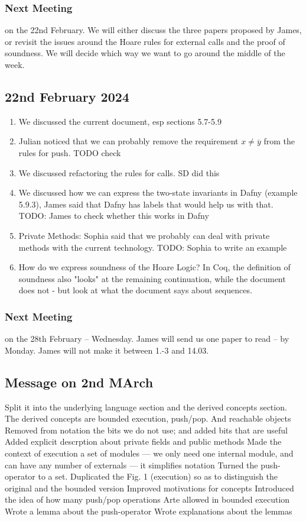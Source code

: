 \documentclass[acmsmall,review,anonymous]{acmart}\settopmatter{printfolios=true}
\begin{document}
\subsubsection*{Next Meeting}  on the 22nd February. We will either discuss the three papers proposed by James, or revisit the issues around the Hoare rules for external calls and the proof of soundness. We will decide which way we want to go around the middle of the week.


\subsection* {22nd February 2024}
\begin{enumerate}
\item
We discussed the current document, esp sections 5.7-5.9
\item
Julian noticed that we can probably remove the requirement $x\neq\overline{y}$ from the rules for push. TODO check
\item
We discussed refactoring the rules for calls. SD did this
\item
We discussed how we can express the two-state invariants in Dafny (example 5.9.3), James said that Dafny has labels that would help us with that. TODO: James to check whether this works in Dafny
\item 
Private Methods: Sophia said that we probably can deal with private methods with the current technology. TODO: Sophia to write an example
\item
How do we express soundness of the Hoare Logic? In Coq, the definition of soundness also "looks"  at the remaining continuation, while the document does not - but look at what the document says about sequences.
 \end{enumerate}
 
 \subsubsection*{Next Meeting}  on the 28th February -- Wednesday. James will send us one paper to read -- by Monday. 
 James will not make it between 1.-3 and 14.03.
 
 \subsection{Message on 2nd MArch}
 
  
Split it into the underlying language section and the derived concepts section. The derived concepts are bounded execution, push/pop. And reachable objects
Removed from notation the bits we do not use; and added bits that are useful
Added explicit descrption about private fields and public methods 
Made the context of execution a set of modules — we only need one internal module, and can have any number of externals — it simplifies notation
Turned the push-operator to a set.
Duplicated the Fig. 1 (execution) so as to distinguish the original and the bounded version
Improved motivations for concepts
Introduced the idea of how many push/pop operations Arte allowed in bounded execution
Wrote a lemma about the push-operator
Wrote explanations about the lemmas
\end{document}
